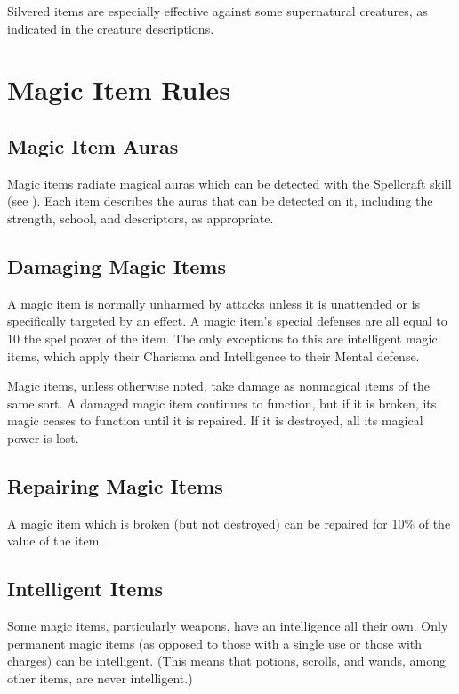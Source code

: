 Silvered items are especially effective against some supernatural creatures, as indicated in the creature descriptions.

\section{Magic Item Rules}

\subsection{Magic Item Auras}

Magic items radiate magical auras which can be detected with the Spellcraft skill (see ).
Each item describes the auras that can be detected on it, including the strength, school, and descriptors, as appropriate.

\subsection{Damaging Magic Items}

A magic item is normally unharmed by attacks unless it is unattended or is specifically targeted by an effect.
A magic item's special defenses are all equal to 10 \add the spellpower of the item.
The only exceptions to this are intelligent magic items, which apply their Charisma and Intelligence to their Mental defense.

Magic items, unless otherwise noted, take damage as nonmagical items of the same sort.
A damaged magic item continues to function, but if it is broken, its magic ceases to function until it is repaired.
If it is destroyed, all its magical power is lost.

\subsection{Repairing Magic Items}

A magic item which is broken (but not destroyed) can be repaired for 10\% of the value of the item.

\subsection{Intelligent Items}

Some magic items, particularly weapons, have an intelligence all their own.
Only permanent magic items (as opposed to those with a single use or those with charges) can be intelligent.
(This means that potions, scrolls, and wands, among other items, are never intelligent.)

